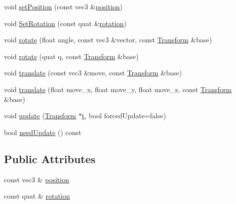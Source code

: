 \begin{DoxyCompactItemize}
\item 
void \hyperlink{class_agmd_maths_1_1_transform_af7c4fff5b997d3bd4c0de1aca80db2ef}{set\+Position} (const vec3 \&\hyperlink{class_agmd_maths_1_1_transform_acebb687500339c406d42ad7a98470210}{position})
\item 
void \hyperlink{class_agmd_maths_1_1_transform_a00ac2d8b2a532482b05e6169667c3191}{Set\+Rotation} (const quat \&\hyperlink{class_agmd_maths_1_1_transform_ad6d49103ed9dbf40cc77cb55b024010b}{rotation})
\item 
void \hyperlink{class_agmd_maths_1_1_transform_a67c9b56bea89b7085505bd3b2f479cce}{rotate} (float angle, const vec3 \&vector, const \hyperlink{class_agmd_maths_1_1_transform}{Transform} \&base)
\item 
void \hyperlink{class_agmd_maths_1_1_transform_a1ddbf2fff41a96c88defdeaa268be254}{rotate} (quat q, const \hyperlink{class_agmd_maths_1_1_transform}{Transform} \&base)
\item 
void \hyperlink{class_agmd_maths_1_1_transform_ae905a67d3d6fc2740a4a9a30e320072d}{translate} (const vec3 \&move, const \hyperlink{class_agmd_maths_1_1_transform}{Transform} \&base)
\item 
void \hyperlink{class_agmd_maths_1_1_transform_a0ac7ba153083f7d9c0085e4bb6673c94}{translate} (float move\+\_\+x, float move\+\_\+y, float move\+\_\+z, const \hyperlink{class_agmd_maths_1_1_transform}{Transform} \&base)
\item 
void \hyperlink{class_agmd_maths_1_1_transform_abc27a93e3cac63e8222138b91d098310}{update} (\hyperlink{class_agmd_maths_1_1_transform}{Transform} $\ast$\hyperlink{_examples_2_planet_2_app_8cpp_a125ce9f8ead659256dbdd0816ede24d4}{t}, bool forced\+Update=false)
\item 
bool \hyperlink{class_agmd_maths_1_1_transform_a4b719bb99a251321827d33e90bebad61}{need\+Update} () const 
\end{DoxyCompactItemize}
\subsection*{Public Attributes}
\begin{DoxyCompactItemize}
\item 
const vec3 \& \hyperlink{class_agmd_maths_1_1_transform_acebb687500339c406d42ad7a98470210}{position}
\item 
const quat \& \hyperlink{class_agmd_maths_1_1_transform_ad6d49103ed9dbf40cc77cb55b024010b}{rotation}
\end{DoxyCompactItemize}


